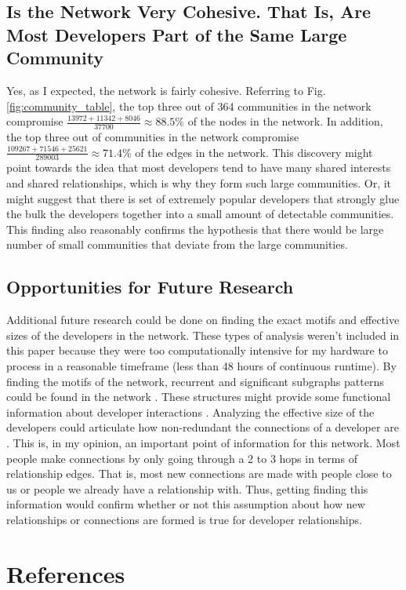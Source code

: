 \documentclass[9pt,twocolumn,twoside]{pnas-new}
\begin{document}
\subsection{Is the Network Very Cohesive. That Is, Are Most Developers Part of the Same Large Community} Yes, as I expected, the network is fairly cohesive. Referring to Fig. \ref{fig:community_table}, the top three out of 364 communities in the network compromise $\frac{13972 + 11342 + 8046}{37700} \approx 88.5\%$ of the nodes in the network. In addition, the top three out of communities in the network compromise $\frac{109267+71546+25621}{289003} \approx 71.4\%$ of the edges in the network. This discovery might point towards the idea that most developers tend to have many shared interests and shared relationships, which is why they form such large communities. Or, it might suggest that there is set of extremely popular developers that strongly glue the bulk the developers together into a small amount of detectable communities. This finding also reasonably confirms the hypothesis that there would be large number of small communities that deviate from the large communities. 

\subsection{Opportunities for Future Research} Additional future research could be done on finding the exact motifs and effective sizes of the developers in the network. These types of analysis weren't included in this paper because they were too computationally intensive for my hardware to process in a reasonable timeframe (less than 48 hours of continuous runtime). By finding the motifs of the network, recurrent and significant subgraphs patterns could be found in the network \cite{wikipediamotif}. These structures might provide some functional information about developer interactions \cite{wikipediamotif}. Analyzing the effective size of the developers could articulate how non-redundant the connections of a developer are \cite{networkxeffectivesize}. This is, in my opinion, an important point of information for this network. Most people make connections by only going through a 2 to 3 hops in terms of relationship edges. That is, most new connections are made with people close to us or people we already have a relationship with. Thus, getting finding this information would confirm whether or not this assumption about how new relationships or connections are formed is true for developer relationships. 


\showacknow{}

\section{References}


\end{document}
